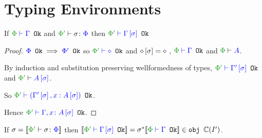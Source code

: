 \documentclass{report}
\begin{document}
\section{Typing Environments}

\begin{theorem}
    If $\wellformedok{\P}{\G}$ and $\typerelation{\P'}{\si}{\P}$ then $\wellformedok{\P'}{\G\ssi}$
    
\end{theorem}

\begin{framed}   
    \begin{proof}
        ${\color{blue} \Phi} \texttt{ Ok}\implies{\color{blue} \Phi'} \texttt{ Ok}$ so $\wellformedok{\P'}{\nil}$
        and $\diamond\left[\sigma\right] = \diamond$
        \bi, $\wellformedok{\P}{\G}$ and $\wellformed{\P}{A}$.
        
        By induction and substitution preserving wellformedness of types, $\wellformedok{\P'}{\G'\ssi}$ and $\wellformed{\P'}{A\ssi}$.
        
        
        So $\wellformedok{\P'}{(\G'\ssi, x: A\ssi)}$.
        
        Hence $\wellformedok{\P'}{\gax\ssi}$.
    \end{proof}
    
\end{framed}


\begin{theorem}
    If $\si = \deno{\typerelation{\P'}{\si}{\P}}$ then $\deno{\wellformedok{\P'}{\G\ssi}} = \si\star\deno{\wellformedok{\P}{\G}}\in\obj\C(I')$.
\end{theorem}
\end{document}
